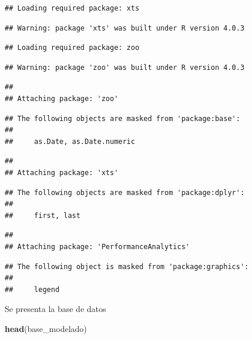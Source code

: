 \documentclass[
  11pt,
]{book}
\newenvironment{Shaded}{\begin{snugshade}}{\end{snugshade}}
\newcommand{\KeywordTok}[1]{\textcolor[rgb]{0.13,0.29,0.53}{\textbf{#1}}}
\newcommand{\NormalTok}[1]{#1}
\begin{document}
\begin{verbatim}
## Loading required package: xts
\end{verbatim}

\begin{verbatim}
## Warning: package 'xts' was built under R version 4.0.3
\end{verbatim}

\begin{verbatim}
## Loading required package: zoo
\end{verbatim}

\begin{verbatim}
## Warning: package 'zoo' was built under R version 4.0.3
\end{verbatim}

\begin{verbatim}
## 
## Attaching package: 'zoo'
\end{verbatim}

\begin{verbatim}
## The following objects are masked from 'package:base':
## 
##     as.Date, as.Date.numeric
\end{verbatim}

\begin{verbatim}
## 
## Attaching package: 'xts'
\end{verbatim}

\begin{verbatim}
## The following objects are masked from 'package:dplyr':
## 
##     first, last
\end{verbatim}

\begin{verbatim}
## 
## Attaching package: 'PerformanceAnalytics'
\end{verbatim}

\begin{verbatim}
## The following object is masked from 'package:graphics':
## 
##     legend
\end{verbatim}

Se presenta la base de datos

\begin{Shaded}
\begin{Highlighting}[]
\KeywordTok{head}\NormalTok{(base_modelado)}
\end{Highlighting}
\end{Shaded}
\end{document}

